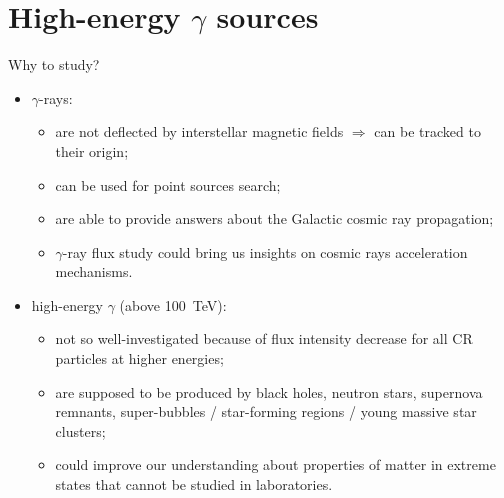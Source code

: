 
\begin{frame}
\titlepage
\end{frame}

\section{High-energy \texorpdfstring{$\gamma$}{gamma} sources}

\begin{frame}{Why to study?}
  \begin{itemize}
    \item $\gamma$-rays:
    \begin{itemize}
	\item are not deflected by interstellar magnetic fields $\Rightarrow$ can be tracked to their origin;
	\item can be used for point sources search;
	\item are able to provide answers about the Galactic cosmic ray propagation;
	\item $\gamma$-ray flux study could bring us insights on cosmic rays acceleration mechanisms.
    \end{itemize}
    \item high-energy $\gamma$ (above 100~TeV):
    \begin{itemize}
	\item not so well-investigated because of flux intensity decrease for all CR particles at higher energies;
	\item are supposed to be produced by black holes, neutron stars, supernova remnants, super-bubbles / star-forming regions / young massive star clusters;
	\item could improve our understanding about properties of matter in extreme states that cannot be studied in laboratories.
    \end{itemize}
  \end{itemize}
\end{frame}

